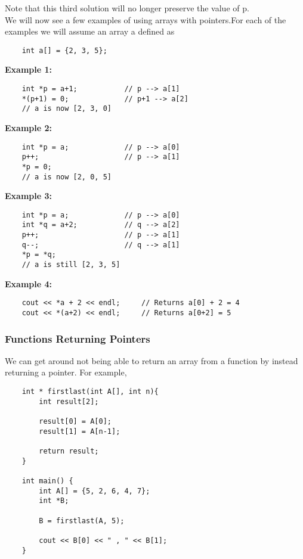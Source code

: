 \documentclass[]{article}
\begin{document}
Note that this third solution will no longer preserve the value of p. \\

We will now see a few examples of using arrays with pointers.For each of the examples we will assume an array a defined as

\begin{lstlisting}
	int a[] = {2, 3, 5};
\end{lstlisting}\bigbreak


\textbf{Example 1:} 
\begin{lstlisting}
	int *p = a+1;			// p --> a[1]
	*(p+1) = 0;				// p+1 --> a[2]
	// a is now [2, 3, 0]
\end{lstlisting}\bigbreak

\textbf{Example 2:} 
\begin{lstlisting}
	int *p = a;				// p --> a[0]
	p++;					// p --> a[1]
	*p = 0;	
	// a is now [2, 0, 5]
\end{lstlisting}\bigbreak

\textbf{Example 3:} 
\begin{lstlisting}
	int *p = a;				// p --> a[0]
	int *q = a+2;			// q --> a[2]
	p++;					// p --> a[1]
	q--;					// q --> a[1]
	*p = *q;
	// a is still [2, 3, 5]
\end{lstlisting}\bigbreak

\textbf{Example 4:} 
\begin{lstlisting}
	cout << *a + 2 << endl;		// Returns a[0] + 2 = 4
	cout << *(a+2) << endl;		// Returns a[0+2] = 5
\end{lstlisting}\bigbreak

\subsubsection{Functions Returning Pointers}
\bigbreak

We can get around not being able to return an array from a function by instead returning a pointer. For example, 

\begin{lstlisting}
	int * firstlast(int A[], int n){
		int result[2];
		
		result[0] = A[0];
		result[1] = A[n-1];
		
		return result;
	}

	int main() {
		int A[] = {5, 2, 6, 4, 7};
		int *B;
		
		B = firstlast(A, 5);
		
		cout << B[0] << " , " << B[1];
	}
\end{lstlisting}\bigbreak
\end{document}
